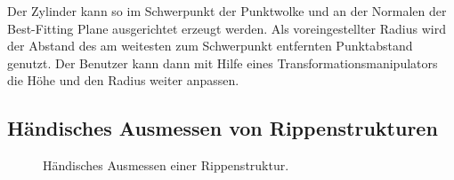 Der Zylinder kann so im Schwerpunkt der Punktwolke und an der Normalen der Best-Fitting Plane ausgerichtet erzeugt werden. Als voreingestellter Radius wird der Abstand des am weitesten zum Schwerpunkt entfernten Punktabstand genutzt.
Der Benutzer kann dann mit Hilfe eines Transformationsmanipulators die Höhe und den Radius weiter anpassen.







\subsection{H\"andisches Ausmessen von Rippenstrukturen}
\label{ribMeasure}

\begin{figure}[ht]
    \centering 
\caption{H\"andisches Ausmessen einer Rippenstruktur.} 
\label{im:domes}
\end{figure} 